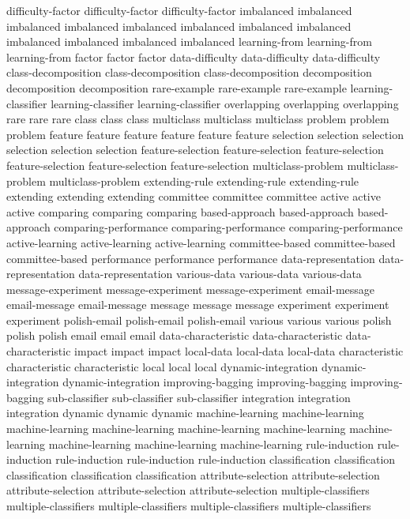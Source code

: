 difficulty-factor	difficulty-factor	difficulty-factor	
imbalanced	imbalanced	imbalanced	imbalanced	imbalanced	imbalanced	imbalanced	imbalanced	imbalanced	imbalanced	imbalanced	imbalanced	
learning-from	learning-from	learning-from	
factor	factor	factor	
data-difficulty	data-difficulty	data-difficulty	
class-decomposition	class-decomposition	class-decomposition	
decomposition	decomposition	decomposition	
rare-example	rare-example	rare-example	
learning-classifier	learning-classifier	learning-classifier	
overlapping	overlapping	overlapping	
rare	rare	rare	
class	class	class	
multiclass	multiclass	multiclass	
problem	problem	problem	
feature	feature	feature	feature	feature	feature	
selection	selection	selection	selection	selection	selection	
feature-selection	feature-selection	feature-selection	feature-selection	feature-selection	feature-selection	
multiclass-problem	multiclass-problem	multiclass-problem	
extending-rule	extending-rule	extending-rule	
extending	extending	extending	
committee	committee	committee	
active	active	active	
comparing	comparing	comparing	
based-approach	based-approach	based-approach	
comparing-performance	comparing-performance	comparing-performance	
active-learning	active-learning	active-learning	
committee-based	committee-based	committee-based	
performance	performance	performance	
data-representation	data-representation	data-representation	
various-data	various-data	various-data	
message-experiment	message-experiment	message-experiment	
email-message	email-message	email-message	
message	message	message	
experiment	experiment	experiment	
polish-email	polish-email	polish-email	
various	various	various	
polish	polish	polish	
email	email	email	
data-characteristic	data-characteristic	data-characteristic	
impact	impact	impact	
local-data	local-data	local-data	
characteristic	characteristic	characteristic	
local	local	local	
dynamic-integration	dynamic-integration	dynamic-integration	
improving-bagging	improving-bagging	improving-bagging	
sub-classifier	sub-classifier	sub-classifier	
integration	integration	integration	
dynamic	dynamic	dynamic	
machine-learning	machine-learning	machine-learning	machine-learning	machine-learning	machine-learning	machine-learning	machine-learning	machine-learning	machine-learning	
rule-induction	rule-induction	rule-induction	rule-induction	rule-induction	
classification	classification	classification	classification	classification	
attribute-selection	attribute-selection	attribute-selection	attribute-selection	attribute-selection	
multiple-classifiers	multiple-classifiers	multiple-classifiers	multiple-classifiers	multiple-classifiers	
